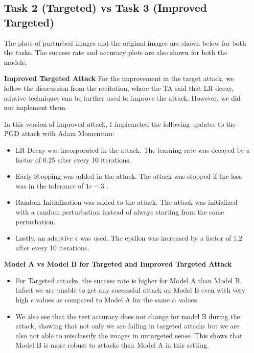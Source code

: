 
\subsection{Task 2 (Targeted) vs Task 3 (Improved Targeted)}


\begin{solve}

The plots of purturbed images and the original images are shown below for both the tasks. The success rate and accuracy plots are also shown for both the models.

\textbf{Improved Targeted Attack}
For the improvement in the target attack, we follow the dicscussion from the recitation, where the TA said that LR decay, adptive techniques can be further used to improve the attack. However, we did not implement them.

In this version of improved attack, I implemeted the following updates to the PGD attack with Adam Momentum:
\begin{itemize}
    \item LR Decay was incorporated in the attack. The learning rate was decayed by a factor of 0.25 after every 10 iterations.
    \item Early Stopping was added in the attack. The attack was stopped if the loss was in the tolerance of $1e-3$ .
    \item Random Initialization was added to the attack. The attack was initialized with a random perturbation instead of always starting from the same perturbation.
    \item Lastly, an adaptive $\epsilon$ was used. The epsilon was increased by a factor of 1.2 after every 10 iterations.
\end{itemize}


\textbf{Model A vs Model B for Targeted and Improved Targeted Attack}

\begin{itemize}
    \item For Targeted attacks, the success rate is higher for Model A than Model B. Infact we are unable to get any successful attack on Model B even with very high $\epsilon$ values as compared to Model A for the same $\alpha$ values.
    \item 
    We also see that the test accuracy does not change for model B during the attack, showing that not only we are failing in targeted attacks but we are also not able to misclassify the images in untargeted sense.
    This shows that Model B is more robust to attacks than Model A in this setting.


\end{itemize}
\end{solve}
